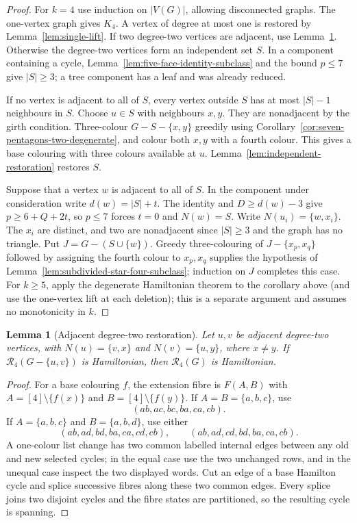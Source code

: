 \documentclass[11pt]{article}
\newtheorem{lemma}[theorem]{Lemma}
\theoremstyle{remark}
\newcommand{\R}{\mathcal R}
\numberwithin{equation}{section}
\begin{document}
\begin{proof}
For $k=4$ use induction on $|V(G)|$, allowing disconnected graphs.  The
one-vertex graph gives $K_4$.  A vertex of degree at most one is restored by
Lemma~\ref{lem:single-lift}.  If two degree-two vertices are adjacent, use
Lemma~\ref{lem:adjacent-two-four}.  Otherwise the degree-two
vertices form an independent set $S$.  In a component containing a cycle,
Lemma~\ref{lem:five-face-identity-subclass} and the bound $p\le7$ give
$|S|\ge3$; a tree component has a leaf and was already reduced.

If no vertex is adjacent to all of $S$, every vertex outside $S$ has at most
$|S|-1$ neighbours in $S$.  Choose $u\in S$ with neighbours $x,y$.  They are
nonadjacent by the girth condition.  Three-colour $G-S-\{x,y\}$ greedily
using Corollary~\ref{cor:seven-pentagons-two-degenerate}, and colour both
$x,y$ with a fourth colour.  This gives a base colouring with three colours
available at $u$.  Lemma~\ref{lem:independent-restoration} restores $S$.

Suppose that a vertex $w$ is adjacent to all of $S$.  In the component under
consideration write $d(w)=|S|+t$.  The identity and
$D\ge d(w)-3$ give $p\ge6+Q+2t$, so $p\le7$ forces $t=0$ and
$N(w)=S$.  Write $N(u_i)=\{w,x_i\}$.  The $x_i$ are distinct, and two are
nonadjacent since $|S|\ge3$ and the graph has no triangle.  Put
$J=G-(S\cup\{w\})$.  Greedy three-colouring of $J-\{x_p,x_q\}$ followed by
assigning the fourth colour to $x_p,x_q$ supplies the hypothesis of
Lemma~\ref{lem:subdivided-star-four-subclass}; induction on $J$ completes
this case.  For $k\ge5$, apply the degenerate Hamiltonian theorem to the
corollary above (and use the one-vertex lift at each deletion); this is a
separate argument and assumes no monotonicity in $k$.
\end{proof}

\begin{lemma}[Adjacent degree-two restoration]
\label{lem:adjacent-two-four}
Let $u,v$ be adjacent degree-two vertices, with
$N(u)=\{v,x\}$ and $N(v)=\{u,y\}$, where $x\ne y$.  If
$\R_4(G-\{u,v\})$ is Hamiltonian, then $\R_4(G)$ is Hamiltonian.
\end{lemma}
\begin{proof}
For a base colouring $f$, the extension fibre is
$F(A,B)$ with $A=[4]\setminus\{f(x)\}$ and
$B=[4]\setminus\{f(y)\}$.  If $A=B=\{a,b,c\}$, use
\[
(ab,ac,bc,ba,ca,cb).
\]
If $A=\{a,b,c\}$ and $B=\{a,b,d\}$, use either
\[
(ab,ad,bd,ba,ca,cd,cb),\qquad
(ab,ad,cd,bd,ba,ca,cb).
\]
A one-colour list change has two common labelled internal edges between
any old and new selected cycles; in the equal case use the two unchanged
rows, and in the unequal case inspect the two displayed words.  Cut an
edge of a base Hamilton cycle and splice successive fibres along these
two common edges.  Every splice joins two disjoint cycles and the fibre
states are partitioned, so the resulting cycle is spanning.
\end{proof}
\end{document}
